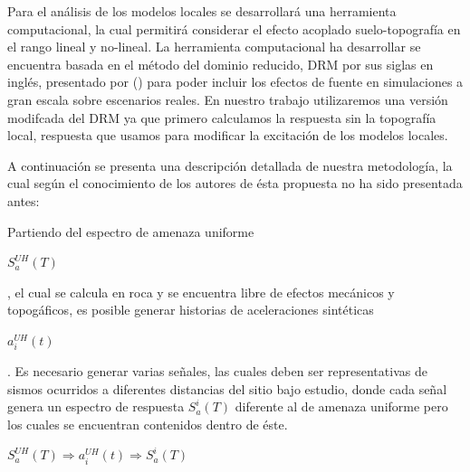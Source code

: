 \documentclass[spanish,letterpaper,12pt,twoside,openany]{article}
\begin{document}
%
Para el análisis de los modelos locales se desarrollará una herramienta computacional, la cual permitirá considerar el efecto acoplado suelo-topografía en el rango lineal y no-lineal. La herramienta computacional ha desarrollar se encuentra basada en el método del dominio reducido, DRM por sus siglas en inglés, presentado por \citeauthor{bielak2003} (\citeyear{bielak2003}) para poder incluir los efectos de fuente en simulaciones a gran escala sobre escenarios reales. En nuestro trabajo utilizaremos una versión modifcada del DRM ya que primero calculamos la respuesta sin la topografía local, respuesta que usamos para modificar la excitación de los modelos locales.

A continuación se presenta una descripción detallada de nuestra metodología, la cual según el conocimiento de los autores de ésta propuesta no ha sido presentada antes:

Partiendo del espectro de amenaza uniforme \begin{large} $S_{a}^{UH} \left( T \right)$ \end{large}, el cual se calcula en roca y se encuentra libre de efectos mecánicos y topogáficos, es posible generar historias de aceleraciones sintéticas \begin{large} $a_{i}^{UH}\left( t \right)$ \end{large}. Es necesario generar varias señales, las cuales deben ser representativas de sismos ocurridos a diferentes distancias del sitio bajo estudio, donde cada señal genera un espectro de respuesta $S_{a}^{i} \left( T \right)$ diferente al de amenaza uniforme pero los cuales se encuentran contenidos dentro de éste.

\begin{large}
	$S_{a}^{UH} \left( T \right) \Rightarrow a_{i}^{UH}\left( t \right) \Rightarrow S_{a}^{i} \left( T \right)$
\end{large}
\end{document}
